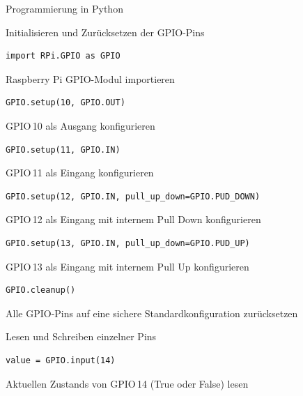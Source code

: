 {
\setlength{\leftmargini}{1.2em}
\footnotesize

\begin{frame}{Programmierung in Python}
    \begin{block}{Initialisieren und Zurücksetzen der GPIO-Pins}
        \begin{lstlisting}[style=MethodenListe, gobble=12]
            import RPi.GPIO as GPIO
        \end{lstlisting}
        Raspberry Pi GPIO-Modul importieren
        \medskip

        \begin{lstlisting}[style=MethodenListe, gobble=12]
            GPIO.setup(10, GPIO.OUT)
        \end{lstlisting}
        GPIO\,10 als Ausgang konfigurieren
        \medskip

        \begin{lstlisting}[style=MethodenListe, gobble=12]
            GPIO.setup(11, GPIO.IN)
        \end{lstlisting}
        GPIO\,11 als Eingang konfigurieren
        \medskip

        \begin{lstlisting}[style=MethodenListe, gobble=12]
            GPIO.setup(12, GPIO.IN, pull_up_down=GPIO.PUD_DOWN)
        \end{lstlisting}
        GPIO\,12 als Eingang mit internem Pull Down konfigurieren
        \medskip

        \begin{lstlisting}[style=MethodenListe, gobble=12]
            GPIO.setup(13, GPIO.IN, pull_up_down=GPIO.PUD_UP)
        \end{lstlisting}
        GPIO\,13 als Eingang mit internem Pull Up konfigurieren
        \medskip

        \begin{lstlisting}[style=MethodenListe, gobble=12]
            GPIO.cleanup()
        \end{lstlisting}
        Alle GPIO-Pins auf eine sichere Standardkonfiguration zurücksetzen
        \medskip
    \end{block}

    \framebreak

    \begin{block}{Lesen und Schreiben einzelner Pins}
        \begin{lstlisting}[style=MethodenListe, gobble=12]
            value = GPIO.input(14)
        \end{lstlisting}
        Aktuellen Zustands von GPIO\,14 (True oder False) lesen
        \medskip


\end{block}
\end{frame}}
